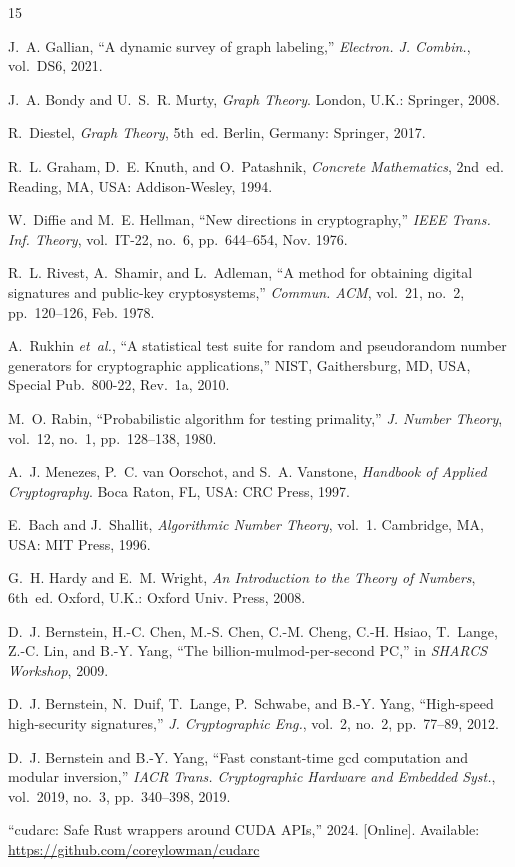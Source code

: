 \documentclass[lettersize,journal]{IEEEtran}
\begin{document}
\begin{thebibliography}{15}


J.~A. Gallian, ``A dynamic survey of graph labeling,'' \textit{Electron. J. Combin.}, vol.~DS6, 2021.

J.~A. Bondy and U.~S.~R. Murty, \textit{Graph Theory}. London, U.K.: Springer, 2008.

R.~Diestel, \textit{Graph Theory}, 5th~ed. Berlin, Germany: Springer, 2017.

R.~L. Graham, D.~E. Knuth, and O.~Patashnik, \textit{Concrete Mathematics}, 2nd~ed. Reading, MA, USA: Addison-Wesley, 1994.

W.~Diffie and M.~E. Hellman, ``New directions in cryptography,'' \textit{IEEE Trans. Inf. Theory}, vol.~IT-22, no.~6, pp.~644--654, Nov. 1976.

R.~L. Rivest, A.~Shamir, and L.~Adleman, ``A method for obtaining digital signatures and public-key cryptosystems,'' \textit{Commun. ACM}, vol.~21, no.~2, pp.~120--126, Feb. 1978.

A.~Rukhin \textit{et~al.}, ``A statistical test suite for random and pseudorandom number generators for cryptographic applications,'' NIST, Gaithersburg, MD, USA, Special Pub.~800-22, Rev.~1a, 2010.

M.~O. Rabin, ``Probabilistic algorithm for testing primality,'' \textit{J. Number Theory}, vol.~12, no.~1, pp.~128--138, 1980.

A.~J. Menezes, P.~C. van Oorschot, and S.~A. Vanstone, \textit{Handbook of Applied Cryptography}. Boca Raton, FL, USA: CRC Press, 1997.

E.~Bach and J.~Shallit, \textit{Algorithmic Number Theory}, vol.~1. Cambridge, MA, USA: MIT Press, 1996.

G.~H. Hardy and E.~M. Wright, \textit{An Introduction to the Theory of Numbers}, 6th~ed. Oxford, U.K.: Oxford Univ. Press, 2008.

D.~J. Bernstein, H.-C. Chen, M.-S. Chen, C.-M. Cheng, C.-H. Hsiao, T.~Lange, Z.-C. Lin, and B.-Y. Yang, ``The billion-mulmod-per-second PC,'' in \textit{SHARCS Workshop}, 2009.

D.~J. Bernstein, N.~Duif, T.~Lange, P.~Schwabe, and B.-Y. Yang, ``High-speed high-security signatures,'' \textit{J. Cryptographic Eng.}, vol.~2, no.~2, pp.~77--89, 2012.

D.~J. Bernstein and B.-Y. Yang, ``Fast constant-time gcd computation and modular inversion,'' \textit{IACR Trans. Cryptographic Hardware and Embedded Syst.}, vol.~2019, no.~3, pp.~340--398, 2019.

``cudarc: Safe Rust wrappers around CUDA APIs,'' 2024. [Online]. Available: \url{https://github.com/coreylowman/cudarc}

\end{thebibliography}
\end{document}

